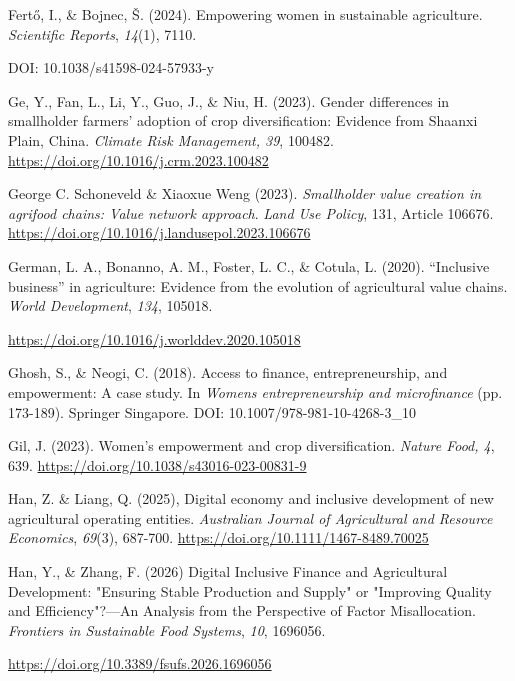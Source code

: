 ﻿\documentclass[sn-mathphys-num]{sn-jnl}
\newcommand{\hl}[1]{#1}
\begin{document}
\hl{Fertő, I., \& Bojnec, Š. (2024). Empowering women in sustainable
agriculture. \emph{Scientific Reports}, \emph{14}(1), 7110.}

\hl{DOI: 10.1038/s41598-024-57933-y}

\hl{Ge, Y., Fan, L., Li, Y., Guo, J., \& Niu, H. (2023). Gender
differences in smallholder farmers' adoption of crop diversification:
Evidence from Shaanxi Plain, China. \emph{Climate Risk Management, 39},
100482.}
\href{https://doi.org/10.1016/j.crm.2023.100482}{\hl{https://doi.org/10.1016/j.crm.2023.100482}}

\hl{George C. Schoneveld \& Xiaoxue Weng (2023). \emph{Smallholder value
creation in agrifood chains: Value network approach}. \emph{Land Use
Policy}, 131, Article 106676.}
\href{https://doi.org/10.1016/j.landusepol.2023.106676}{\hl{https://doi.org/10.1016/j.landusepol.2023.106676}}

\hl{German, L. A., Bonanno, A. M., Foster, L. C., \& Cotula, L. (2020).
``Inclusive business'' in agriculture: Evidence from the evolution of
agricultural value chains. \emph{World Development}, \emph{134},
105018.}

\href{https://doi.org/10.1016/j.worlddev.2020.105018}{\hl{https://doi.org/10.1016/j.worlddev.2020.105018}}

\hl{Ghosh, S., \& Neogi, C. (2018). Access to finance, entrepreneurship,
and empowerment: A case study. In \emph{Women\textquotesingle s
entrepreneurship and microfinance} (pp. 173-189). Springer Singapore.}
\hl{DOI: 10.1007/978-981-10-4268-3_10}

\hl{Gil, J. (2023). Women's empowerment and crop diversification.
\emph{Nature Food, 4}, 639.}
\href{https://doi.org/10.1038/s43016-023-00831-9}{\hl{https://doi.org/10.1038/s43016-023-00831-9}}

\hl{Han, Z. \& Liang, Q. (2025), Digital economy and inclusive
development of new agricultural operating entities. \emph{Australian
Journal of Agricultural and Resource Economics}, \emph{69}(3), 687-700.}
\href{https://doi.org/10.1111/1467-8489.70025}{\hl{https://doi.org/10.1111/1467-8489.70025}}

\hl{Han, Y., \& Zhang, F. (2026) Digital Inclusive Finance and
Agricultural Development: "Ensuring Stable Production and Supply" or
"Improving Quality and Efficiency"?---An Analysis from the Perspective
of Factor Misallocation. \emph{Frontiers in Sustainable Food Systems},
\emph{10}, 1696056.}

\href{https://doi.org/10.3389/fsufs.2026.1696056}{\hl{https://doi.org/10.3389/fsufs.2026.1696056}}
\end{document}
